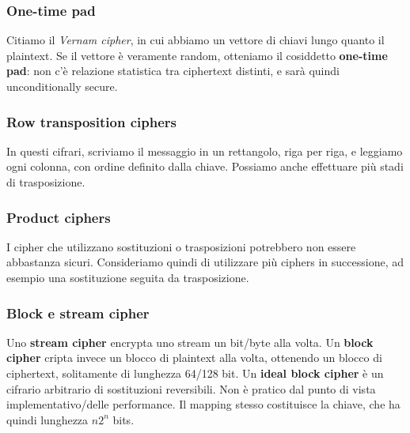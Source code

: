 \documentclass[11pt]{article}
\begin{document}
\subsubsection{One-time pad}
Citiamo il \textit{Vernam cipher}, in cui abbiamo un vettore di chiavi lungo quanto il plaintext. Se il vettore è veramente random, otteniamo il cosiddetto \textbf{one-time pad}: non c'è relazione statistica tra ciphertext distinti, e sarà quindi unconditionally secure.
\subsubsection{Row transposition ciphers}
In questi cifrari, scriviamo il messaggio in un rettangolo, riga per riga, e leggiamo ogni colonna, con ordine definito dalla chiave. Possiamo anche effettuare più stadi di trasposizione. 
\subsubsection{Product ciphers}
I cipher che utilizzano sostituzioni o trasposizioni potrebbero non essere abbastanza sicuri. Consideriamo quindi di utilizzare più ciphers in successione, ad esempio una sostituzione seguita da trasposizione. 
\subsubsection{Block e stream cipher}
Uno \textbf{stream cipher} encrypta uno stream un bit/byte alla volta. Un \textbf{block cipher} cripta invece un blocco di plaintext alla volta, ottenendo un blocco di ciphertext, solitamente di lunghezza 64/128 bit. Un \textbf{ideal block cipher} è un cifrario arbitrario di sostituzioni reversibili. Non è pratico dal punto di vista implementativo/delle performance. Il mapping stesso costituisce la chiave, che ha quindi lunghezza $n2^n$ bits. 
\end{document}
